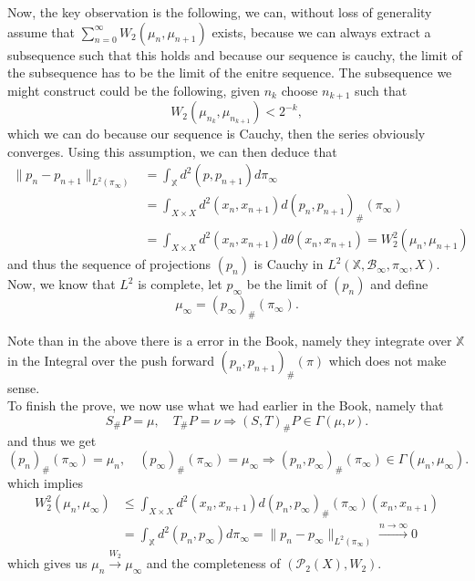 \documentclass[15pt]{article}
\begin{document}
Now, the key observation is the following, we can, without loss of generality assume that $\sum\limits_{n = 0}^\infty W_2(\mu_n,\mu_{n+1})$ exists, 
because we can always extract a subsequence such that this holds and because our sequence is cauchy, the limit of the subsequence has to be the limit of the enitre sequence. 
The subsequence we might construct could be the following, given $n_k$ choose $n_{k+1}$ such that $$W_2(\mu_{n_k},\mu_{n_{k+1}}) < 2^{-k},$$ 
which we can do because our sequence is Cauchy, then the series obviously converges.   
Using this assumption, we can then deduce that  
\begin{align*}\|p_n-p_{n+1}\|_{L^2(\pi_{\infty})} &= \int_\mathbb{X} d^2(p,p_{n+1}) d\pi_\infty \\ &= \int_{X \times X} d^2(x_n, x_{n+1}) d(p_n,p_{n+1})_{\#}(\pi_\infty) \\ &= \int_{X \times X} d^2(x_n,x_{n+1}) d\theta(x_n,x_{n+1}) = W_2^2(\mu_n,\mu_{n+1})\end{align*} 
and thus the sequence of projections $(p_n)$ is Cauchy in $L^2(\mathbb{X},\mathcal{B}_\infty,\pi_\infty, X)$. Now, we know that $L^2$ is complete, let $p_\infty$ be the limit of $(p_n)$ and define $$\mu_\infty = (p_\infty)_{\#}(\pi_\infty).$$

Note than in the above there is a error in the Book, namely they integrate over $\mathbb{X}$ in the Integral over the push forward $(p_n,p_{n+1})_{\#}(\pi)$ which does not make sense. \\ 

To finish the prove, we now use what we had earlier in the Book, namely that $$S_{\#}P = \mu, \quad T_{\#}P = \nu \Rightarrow (S,T)_{\#}P \in \Gamma(\mu,\nu).$$ 
and thus we get $$(p_n)_{\#}(\pi_\infty) = \mu_n, \quad (p_\infty)_{\#}(\pi_\infty) = \mu_\infty \Rightarrow (p_n,p_{\infty})_{\#}(\pi_\infty) \in \Gamma(\mu_n,\mu_\infty).$$
which implies \begin{align*}W_2^2(\mu_n,\mu_\infty) &\leq \int_{X \times X} d^2(x_n,x_{n+1}) d(p_n,p_\infty)_{\#}(\pi_\infty)(x_n,x_{n+1}) \\ &= \int_{\mathbb{X}} d^2(p_n,p_\infty) d\pi_\infty = \|p_n-p_\infty\|_{L^2(\pi_\infty)} \xrightarrow{n \to \infty} 0\end{align*} 
which gives us $\mu_n \xrightarrow{W_2} \mu_\infty$ and the completeness of $(\mathcal{P}_2(X), W_2)$. \\
\end{document}
